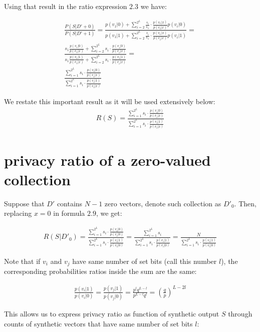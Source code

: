 \documentclass[11pt,draft]{article}
\begin{document}
Using that result in the ratio expression $2.3$ we have:

\begin{align}
\frac{P(S|D'+0)}{P(S|D'+1)} = \frac{ p(v_1|0)  + \sum_{i=2}^{2^L} \frac{s_i}{s_1}  \cdot \frac{p(v_1|x)}{p(v_i|x)}  p(v_i|0) } {p(v_1|1)  + \sum_{i=2}^{2^L} \frac{s_i}{s_1}  \cdot \frac{p(v_1|x)}{p(v_i|x)} p(v_i|1)} = \\
\frac{ s_1 \frac{p(v_1|0)}{p(v_1|x)} + \sum_{i=2}^{2^L} s_i  \cdot \frac{p(v_i|0)}{p(v_i|x)}   } {s_1 \frac{p(v_1|1)}{p(v_1|x)} +   \sum_{i=2}^{2^L}  s_i \cdot  \frac{p(v_i|1)}{p(v_i|x)}   }  = \\
\frac{ \sum_{i=1}^{2^L} s_i  \cdot \frac{p(v_i|0)}{p(v_i|x)}   } { \sum_{i=1}^{2^L}  s_i \cdot  \frac{p(v_i|1)}{p(v_i|x)}   } 
\end{align}

We restate this important result as it will be used extensively below:
\begin{align}
R(S) = \frac{ \sum_{i=1}^{2^L} s_i  \cdot \frac{p(v_i|0)}{p(v_i|x)}   } { \sum_{i=1}^{2^L}  s_i \cdot  \frac{p(v_i|1)}{p(v_i|x)}   } 
\end{align}


\section{privacy ratio of a zero-valued collection}

Suppose that $D'$ contains $N-1$ zero vectors, denote such collection as $D'_0$.  Then, replacing $x=0$ in formula $2.9$, we get:

\begin{align}
R(S | D'_0) = \frac{ \sum_{i=1}^{2^L} s_i  \cdot \frac{p(v_i|0)}{p(v_i|0)}   } { \sum_{i=1}^{2^L}  s_i \cdot  \frac{p(v_i|1)}{p(v_i|0)}} =   \frac{ \sum_{i=1}^{2^L} s_i} { \sum_{i=1}^{2^L}  s_i \cdot  \frac{p(v_i|1)}{p(v_i|0)}}  = \frac{N}{ \sum_{i=1}^{2^L} s_i  \cdot \frac{p(v_i|1)}{p(v_i|0)} }
\end{align}

Note that if $v_i$ and $v_j$ have same number of set bits (call this number $l$), the corresponding probabilities ratios inside the sum are the same:

\begin{align}
\frac{p(v_i|1)}{p(v_i|0)}  = \frac{p(v_j|1)}{p(v_j|0)} = \frac{p^lq^{L-l}}{p^{L-l}q^l } = \left ( \frac{q}{p} \right )^ {L - 2l}
\end{align}

This allows us to express privacy ratio as function of synthetic output $S$ through counts of synthetic vectors that have same number of set bits $l$:
\end{document}
